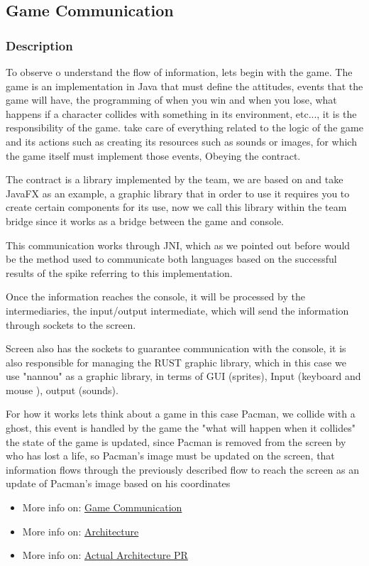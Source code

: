 \subsection{Game Communication}
\subsubsection{Description}
\setlength{\parskip}{1em}
To observe o understand the flow of information, lets begin with the game.
The game is an implementation in Java that must define the attitudes, events that the game will have, the programming of when you win and when you lose, what happens if a character collides with something in its environment, etc..., it is the responsibility of the game. take care of everything related to the logic of the game and its actions such as creating its resources such as sounds or images, for which the game itself must implement those events, Obeying the contract.


The contract is a library implemented by the team, we are based on and take JavaFX as an example, a graphic library that in order to use it requires you to create certain components for its use, now we call this library within the team bridge since it works as a bridge between the game and console.


This communication works through JNI, which as we pointed out before would be the method used to communicate both languages based on the successful results of the spike referring to this implementation.


Once the information reaches the console, it will be processed by the intermediaries, the input/output intermediate, which will send the information through sockets to the screen.


Screen also has the sockets to guarantee communication with the console, it is also responsible for managing the RUST graphic library, which in this case we use "nannou" as a graphic library, in terms of GUI (sprites), Input (keyboard and mouse ), output (sounds).


For how it works lets think about a game in this case Pacman, we collide with a ghost, this event is handled by the game the "what will happen when it collides" the state of the game is updated, since Pacman is removed from the screen by who has lost a life, so Pacman's image must be updated on the screen, that information flows through the previously described flow to reach the screen as an update of Pacman's image based on his coordinates
\begin{itemize}
    \item More info on:  \href{https://tree.taiga.io/project/joseluis-teran-coffeetime/wiki/game-communication}{Game Communication}
      \item More info on:  \href{https://github.com/Pending-Name-21/arquitecture/blob/main/workspace.dsl}{Architecture} 
      \item More info on:  \href{https://github.com/Pending-Name-21/arquitecture/pull/12}{Actual Architecture PR} 
\end{itemize}
